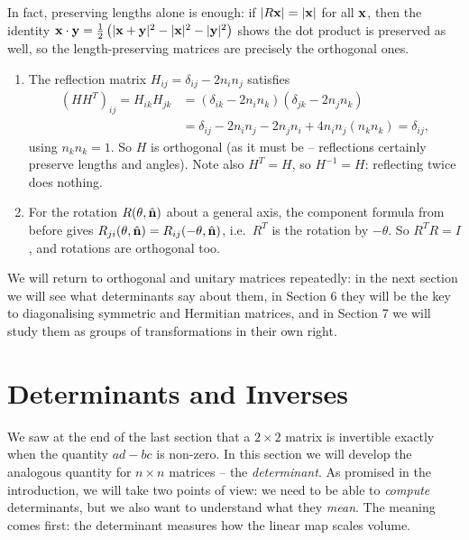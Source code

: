 \documentclass[a4paper]{scrartcl}
\begin{document}
In fact, preserving lengths alone is enough: if $|R\mathbf{x}| = |\mathbf{x}|$ for all $\mathbf{x}$, then the identity $\mathbf{x} \cdot \mathbf{y} = \frac{1}{2}\left(|\mathbf{x} + \mathbf{y}|^2 - |\mathbf{x}|^2 - |\mathbf{y}|^2\right)$ shows the dot product is preserved as well, so the length-preserving matrices are precisely the orthogonal ones.

\begin{example}
	\begin{enumerate}[label=(\roman*)]
		\item The reflection matrix $H_{ij} = \delta_{ij} - 2n_in_j$ satisfies
		\begin{align*}
			(HH^T)_{ij} = H_{ik}H_{jk} &= (\delta_{ik} - 2n_in_k)(\delta_{jk} - 2n_jn_k) \\
			&= \delta_{ij} - 2n_in_j - 2n_jn_i + 4n_in_j (n_kn_k) = \delta_{ij},
		\end{align*}
		using $n_k n_k = 1$. So $H$ is orthogonal (as it must be -- reflections certainly preserve lengths and angles). Note also $H^T = H$, so $H^{-1} = H$: reflecting twice does nothing.
		\item For the rotation $R(\theta, \hat{\mathbf{n}})$ about a general axis, the component formula from before gives $R_{ji}(\theta, \hat{\mathbf{n}}) = R_{ij}(-\theta, \hat{\mathbf{n}})$, i.e.\ $R^T$ is the rotation by $-\theta$. So $R^TR = I$, and rotations are orthogonal too.
	\end{enumerate}
\end{example}

We will return to orthogonal and unitary matrices repeatedly: in the next section we will see what determinants say about them, in Section 6 they will be the key to diagonalising symmetric and Hermitian matrices, and in Section 7 we will study them as groups of transformations in their own right.

\section{Determinants and Inverses}

We saw at the end of the last section that a $2 \times 2$ matrix is invertible exactly when the quantity $ad - bc$ is non-zero. In this section we will develop the analogous quantity for $n \times n$ matrices -- the \emph{determinant}. As promised in the introduction, we will take two points of view: we need to be able to \emph{compute} determinants, but we also want to understand what they \emph{mean}. The meaning comes first: the determinant measures how the linear map scales volume.
\end{document}
